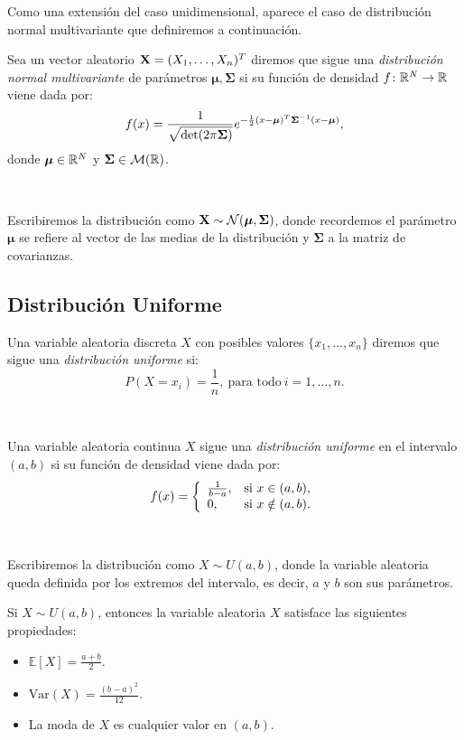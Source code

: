 \documentclass[oneside,openright,titlepage,numbers=noenddot,openany,headinclude,footinclude=true,
cleardoublepage=empty,abstractoff,BCOR=5mm,paper=a4,fontsize=12pt,main=spanish]{scrreprt}
\begin{document}
Como una extensión del caso unidimensional, aparece el caso de distribución normal multivariante que definiremos a continuación.\\

\begin{definition}
Sea un vector aleatorio $\textbf{X}=(X_1,\dots,X_n)^T$ diremos que sigue una \textit{distribución normal multivariante} de parámetros $\bm{\mu},\bm{\Sigma}$ si su función de densidad $f\colon \mathbb{R}^N \to \mathbb{R}$ viene dada por: $$f(x)=\frac{\displaystyle 1}{\displaystyle \sqrt{\text{det}(2\pi \bm{\Sigma})}}e^{-\frac{1}{2}(x-\bm{\mu})^T\bm{\Sigma}^{-1}(x-\bm{\mu})},$$
donde $\bm{\mu}\in \mathbb{R}^N$ y $\bm{\Sigma}\in \mathcal{M}(\mathbb{R})$.
\end{definition}\

Escribiremos la distribución como $\textbf{X} \sim \mathcal{N}(\bm{\mu}, \bm{\Sigma})$, donde recordemos el parámetro $\bm{\mu}$ se refiere al vector de las medias de la distribución y $\bm{\Sigma}$ a la matriz de covarianzas.

\subsection*{Distribución Uniforme}

\begin{definition}
Una variable aleatoria discreta $X$ con posibles valores $\{x_1,\dots,x_n\}$ diremos que sigue una \textit{distribución uniforme} si: $$P(X=x_i)=\frac{1}{n}, \ \text{para todo} \ i=1,\dots,n.$$
\end{definition}\

\begin{definition}
Una variable aleatoria continua $X$ sigue una \textit{distribución uniforme} en el intervalo $(a,b)$ si su función de densidad viene dada por: $$f(x)=\left \{
\begin{array}{l l}
\frac{1}{b-a}, & \mbox{si } x \in (a,b), \\
0, & \mbox{si } x \notin (a,b).
\end{array}
\right.$$
\end{definition}\

Escribiremos la distribución como $X \sim U(a,b)$, donde la variable aleatoria queda definida por los extremos del intervalo, es decir, $a$ y $b$ son sus parámetros.\\

\begin{proposition}[Propiedades]
Si $X \sim U(a,b)$, entonces la variable aleatoria $X$ satisface las siguientes propiedades:
\begin{itemize}
    \item $\mathbb{E}[X]=\frac{a+b}{2}$.
    \item $\text{Var}(X)=\frac{(b-a)^2}{12}$.
    \item La moda de $X$ es cualquier valor en $(a,b)$.
\end{itemize}
\end{proposition}
\end{document}
